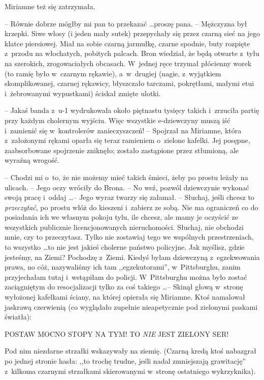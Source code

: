 \documentclass[oneside,polish,11pt,rmheadings]{mwbk}
\begin{document}
Miriamne też się zatrzymała. 

-- Równie dobrze mógłby mi pan to przekazać \ldots  proszę pana. -- Mężczyzna był krzepki. Siwe włosy (i jeden mały sutek)  przepychały się przez czarną sieć na jego klatce piersiowej. Miał na sobie czarną jarmułkę, czarne spodnie, buty rozpięte z~przodu na włochatych, pobitych palcach. Bron wiedział, że będą otwarte z~tyłu na szerokich, zrogowaciałych obcasach. W~jednej ręce trzymał płócienny worek (to ramię było w~czarnym rękawie), a~w~drugiej (nagie, z~wyjątkiem skomplikowanej, czarnej rękawicy, błyszczało tarczami, pokrętłami, małymi etui i~żebrowanymi wypustkami) ściskał zmięte ulotki. 

-- Jakaś banda z~u-1 wydrukowała około piętnastu tysięcy takich i~zrzuciła partię przy każdym cholernym wyjściu. Więc wszystkie e-dziewczyny muszą iść i~zamienić się w~kontrolerów zanieczyszczeń! -- Spojrzał na Miriamne, która z~założonymi rękami oparła się teraz ramieniem o~zielone kafelki. Jej posępne, zaabsorbowane spojrzenie zniknęło; zostało zastąpione przez stłumioną, ale wyraźną wrogość.

-- Chodzi mi o~to, że nie możemy mieć takich śmieci, żeby po prostu leżały na ulicach. -- Jego oczy wróciły do Brona. -- No weź, pozwól dziewczynie wykonać swoją pracę i~oddaj  \ldots  -- Jego wyraz twarzy się załamał. -- Słuchaj, jeśli chcesz to \textit{przeczytać}, po prostu włóż do kieszeni i~zabierz ze sobą. Nie ma ograniczeń co do posiadania ich we własnym pokoju tylu, ile chcesz, ale mamy je oczyścić ze wszystkich publicznie licencjonowanych nieruchomości. Słuchaj, nie obchodzi mnie, czy to przeczytasz. Tylko nie zostawiaj tego we wspólnych przestrzeniach, to wszystko \ldots  to nie jest jakieś cholerne państwo policyjne. Jak myślisz, gdzie jesteśmy, na Ziemi? Pochodzę z~Ziemi. Kiedyś byłam dziewczyną z~egzekwowania prawa, no cóż, nazywaliśmy ich tam ,,egzekutorami'', w~Pittsburghu, zanim przyjechałam tutaj i~wstąpiłam do policji. W~Pittsburghu można było zostać zaciągniętym do resocjalizacji tylko za coś takiego \ldots   -- Skinął głową w~stronę wyłożonej kafelkami ściany, na której opierała się Miriamne. Ktoś namalował jaskrawą czerwienią (co wyglądało zupełnie nieapetycznie pod zielonymi paskami światła): 

POSTAW MOCNO STOPY NA TYM! TO \textit{NIE }JEST ZIELONY SER! 

Pod nim niezdarne strzałki wskazywały na ziemię. (Czarną kredą ktoś nabazgrał po jednej stronie hasła: ,,to trochę trudne, jeśli nadal zmniejszają grawitację'' z~kilkoma czarnymi strzałkami skierowanymi w~stronę ostatniego wykrzyknika). 
\end{document}
